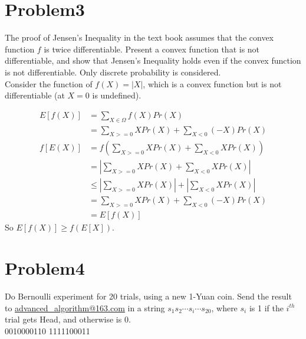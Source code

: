 \documentclass[12pt]{article}
\begin{document}
\section{Problem3}
The proof of Jensen's Inequality in the text book assumes that the convex function $f$ is twice differentiable. Present a convex function that is not differentiable, and show that Jensen's Inequality holds even if the convex function is not differentiable. Only discrete probability is considered.\\

Consider the function of $f(X) = |X|$, which is a convex function but is not differentiable (at $X=0$ is undefined).

\begin{equation}
    \begin{split}
    E[f(X)] &= \sum_{X\in \Omega} f(X) Pr(X) \\
            &= \sum_{X>=0} X Pr(X) + \sum_{X<0} (-X) Pr(X)
    \end{split}
\end{equation}
\begin{equation}
    \begin{split}
    f[E(X)] &= f(\sum_{X>=0} X Pr(X) + \sum_{X<0} X Pr(X))\\
            &= |\sum_{X>=0} X Pr(X) + \sum_{X<0} X Pr(X)| \\
            &\le |\sum_{X>=0} X Pr(X)| + |\sum_{X<0} X Pr(X)| \\
            &= \sum_{X>=0} X Pr(X) + \sum_{X<0} (-X) Pr(X) \\
            &= E[f(X)]
    \end{split}
\end{equation}
So $E[f(X)] \ge f(E[X])$.

\section{Problem4}
Do Bernoulli experiment for 20 trials, using a new 1-Yuan coin. Send the result to \url{advanced\_algorithm@163.com} in a string $s_1s_2 \cdots s_i \cdots s_{20}$, where $s_i$ is 1 if the $i^{th}$ trial gets Head, and otherwise is 0.\\

0010000110 1111100011
\end{document}
